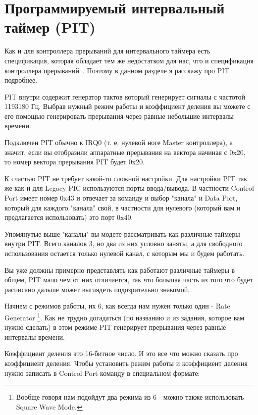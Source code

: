 \section{Программируемый интервальный таймер (PIT)}

Как и для контроллера прерываний для интервального таймера есть спецификация,
которая обладает тем же недостатком для нас, что и спецификация контроллера
прерываний~\cite{INTEL:8254DS}. Поэтому в данном разделе я расскажу про PIT
подробнее.

PIT внутри содержит генератор тактов который генерирует сигналы с частотой
1193180 Гц. Выбрав нужный режим работы и коэффициент деления вы можете с его
помощью генерировать прерывания через равные небольшие интервалы времени.

Подключен PIT обычно к IRQ0 (т. е. нулевой ноге Master контроллера), а значит,
если вы отобразили аппаратные прерывания на вектора начиная с 0x20, то номер
вектора прерывания PIT будет 0x20.

К счастью PIT не требует какой-то сложной настройки. Для настройки PIT так же
как и для Legacy PIC используются порты ввода/вывода. В частности Control Port
имеет номер 0x43 и отвечает за команду и выбор "канала" и Data Port, который для
каждого "канала" свой, в частности для нулевого (который вам и предлагается
использовать) это порт 0x40.

Упомянутые выше "каналы" вы модете рассматривать как различные таймеры внутри
PIT. Всего каналов 3, но два из них условно заняты, а для свободного
использования остается только нулевой канал, с которым мы и будем работать.

Вы уже должны примерно представлять как работают различные таймеры в общем, PIT
мало чем от них отличается, так что большая часть из того что будет расписано
дальше может выглядеть подозрительно знакомой.

Начнем с режимов работы, их 6, как всегда нам нужен только один - Rate Generator
\footnote{Вообще говоря нам подойдут два режима из 6 - можно также использовать
Square Wave Mode.}. Как не трудно догадаться (по названию и из задания, которое
вам нужно сделать) в этом режиме PIT генерирует прерывания через равные
интервалы времени.

Коэффициент деления это 16-битное число. И это все что можно сказать про
коэффициент деления. Чтобы установить режим работы и коэффициент деления нужно
записать в Control Port команду в специальном формате:

